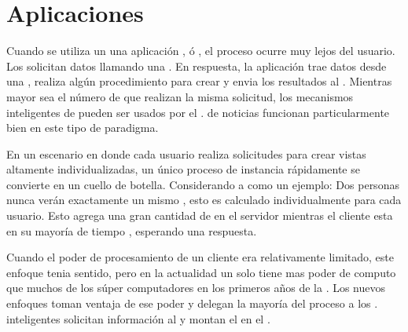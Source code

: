 \section{Aplicaciones \web}

Cuando se utiliza un \backend \running una aplicación \java, \php ó \rails, el proceso ocurre muy lejos del usuario. Los \clients solicitan datos llamando una \uri. En respuesta, la aplicación trae datos desde una \database, realiza algún procedimiento para crear \html y envia los resultados al \client. Mientras mayor sea el número de \clients que realizan la misma solicitud, los mecanismos inteligentes de \caching pueden ser usados por el \server. \sites de noticias funcionan particularmente bien en este tipo de paradigma.

En un escenario en donde cada usuario realiza solicitudes para crear vistas altamente individualizadas, un único proceso de instancia rápidamente se convierte en un cuello de botella. Considerando a \facebook como un ejemplo: Dos personas nunca verán exactamente un mismo \facebookwall, esto es calculado individualmente para cada usuario. Esto agrega una gran cantidad de \stress en el servidor mientras el cliente esta en su mayoría de tiempo \idle, esperando una respuesta.

Cuando el poder de procesamiento de un cliente era relativamente limitado, este enfoque tenia sentido, pero en la actualidad un solo \smartphone tiene mas poder de computo que muchos de los súper computadores en los primeros años de la \web. Los nuevos enfoques toman ventaja de ese poder y delegan la mayoría del proceso a los \clients. \frontends inteligentes solicitan información al \server y montan el \htmldom en el \browser.

